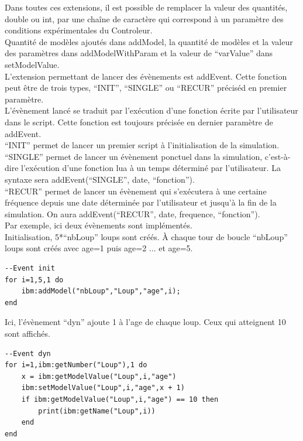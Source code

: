 Dans toutes ces extensions, il est possible de remplacer la valeur des quantités, double ou int, par une chaîne de caractère qui correspond à un paramètre des conditions expérimentales du Controleur.\\
Quantité de modèles ajoutés dans addModel, la quantité de modèles et la valeur des paramètres dans addModelWithParam et la valeur de ``varValue'' dans setModelValue.\\

L'extension permettant de lancer des évènements est addEvent. Cette fonction peut être de trois types, ``INIT'', ``SINGLE'' ou ``RECUR'' préciséd en premier paramètre. \\
L'évènement lancé se traduit par l'exécution d'une fonction écrite par l'utilisateur dans le script. Cette fonction est toujours précisée en dernier paramètre de addEvent.\\
``INIT'' permet de lancer un premier script à l'initialisation de la simulation.\\
``SINGLE'' permet de lancer un évènement ponctuel dans la simulation, c'est-à-dire l'exécution d'une fonction lua à un temps déterminé par l'utilisateur. La syntaxe sera addEvent(``SINGLE'', date, ``fonction'').\\
``RECUR'' permet de lancer un évènement qui s'exécutera à une certaine fréquence depuis une date déterminée par l'utilisateur et jusqu'à la fin de la simulation. On aura addEvent(``RECUR'', date, frequence, ``fonction'').\\

Par exemple, ici deux évènements sont implémentés.\\
Initialisation, 5*``nbLoup'' loups sont créés. À chaque tour de boucle ``nbLoup'' loups sont créés avec age=1 puis age=2 ... et age=5.


\begin{lstlisting}[frame=single]
--Event init
for i=1,5,1 do
	ibm:addModel("nbLoup","Loup","age",i);
end
\end{lstlisting}

Ici, l'évènement ``dyn'' ajoute 1 à l'age de chaque loup. Ceux qui atteignent 10 sont affichés.
\begin{lstlisting}[frame=single]
--Event dyn
for i=1,ibm:getNumber("Loup"),1 do
	x = ibm:getModelValue("Loup",i,"age")
	ibm:setModelValue("Loup",i,"age",x + 1)
	if ibm:getModelValue("Loup",i,"age") == 10 then
		print(ibm:getName("Loup",i))
	end
end
\end{lstlisting}

